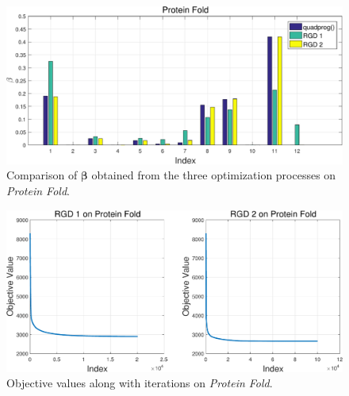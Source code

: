 \documentclass{article}
\begin{document}
\begin{figure}[h]
\centering
\includegraphics[width=\textwidth]{./fig/comparison_proteinFold-crop.pdf}
\caption{Comparison of $\boldsymbol{\beta}$ obtained from the three optimization processes on \emph{Protein Fold}.}
\label{fig:comparison_beta}
\end{figure}

\begin{figure}[t]
\centering
\includegraphics[width=\textwidth]{./fig/obj_proteinFold-crop.pdf}
\caption{Objective values along with iterations on \emph{Protein Fold}.}
\label{fig:objs}
\end{figure}




\clearpage





\end{document}
